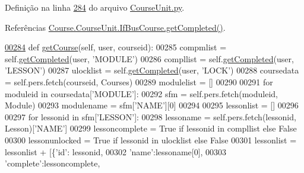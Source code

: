 Definição na linha \hyperlink{CourseUnit_8py_source_l00284}{284} do arquivo \hyperlink{CourseUnit_8py_source}{Course\+Unit.\+py}.



Referências \hyperlink{classCourse_1_1CourseUnit_1_1IfBusCourse_af764ac539a72d830490a80e4d70f567a}{Course.\+Course\+Unit.\+If\+Bus\+Course.\+get\+Completed()}.


\begin{DoxyCode}
\hypertarget{classCourse_1_1CourseUnit_1_1BusCourse_l00284}{}\hyperlink{classCourse_1_1CourseUnit_1_1BusCourse_a924028d96b633d7810b60699af5502ee}{00284}     \textcolor{keyword}{def }\hyperlink{classCourse_1_1CourseUnit_1_1BusCourse_a924028d96b633d7810b60699af5502ee}{getCourse}(self, user, courseid):
00285         compmlist = self.\hyperlink{classCourse_1_1CourseUnit_1_1IfBusCourse_af764ac539a72d830490a80e4d70f567a}{getCompleted}(user, \textcolor{stringliteral}{'MODULE'})
00286         compllist = self.\hyperlink{classCourse_1_1CourseUnit_1_1IfBusCourse_af764ac539a72d830490a80e4d70f567a}{getCompleted}(user, \textcolor{stringliteral}{'LESSON'})
00287         ulocklist = self.\hyperlink{classCourse_1_1CourseUnit_1_1IfBusCourse_af764ac539a72d830490a80e4d70f567a}{getCompleted}(user, \textcolor{stringliteral}{'LOCK'})
00288         coursedata = self.pers.fetch(courseid, Courses)
00289         modulelist = []
00290         
00291         \textcolor{keywordflow}{for} moduleid \textcolor{keywordflow}{in} coursedata[\textcolor{stringliteral}{'MODULE'}]:
00292             sfm = self.pers.fetch(moduleid, Module)
00293             modulename = sfm[\textcolor{stringliteral}{'NAME'}][0]
00294 
00295             lessonlist = []
00296 
00297             \textcolor{keywordflow}{for} lessonid \textcolor{keywordflow}{in} sfm[\textcolor{stringliteral}{'LESSON'}]:
00298                 lessoname = self.pers.fetch(lessonid, Lesson)[\textcolor{stringliteral}{'NAME'}]
00299                 lessoncomplete = \textcolor{keyword}{True} \textcolor{keywordflow}{if} lessonid \textcolor{keywordflow}{in} compllist \textcolor{keywordflow}{else} \textcolor{keyword}{False}
00300                 lessonunlocked = \textcolor{keyword}{True} \textcolor{keywordflow}{if} lessonid \textcolor{keywordflow}{in} ulocklist \textcolor{keywordflow}{else} \textcolor{keyword}{False}
00301                 lessonlist = lessonlist + [\{\textcolor{stringliteral}{'id'}: lessonid,
00302                                             \textcolor{stringliteral}{'name'}:lessoname[0],
00303                                             \textcolor{stringliteral}{'complete'}:lessoncomplete,

\end{DoxyCode}
